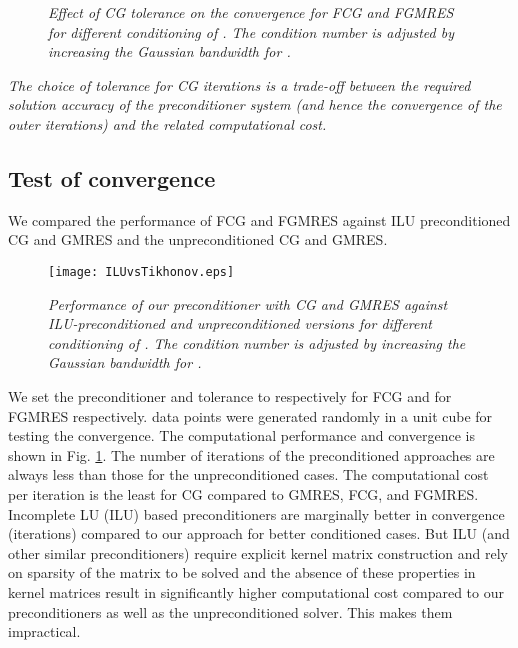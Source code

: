 \documentclass[10pt,journal,letterpaper,compsoc]{IEEEtran}
\begin{document}
\begin{figure}[p]
\centering
{}
\caption{\emph{Effect of CG tolerance  on the convergence for FCG and FGMRES for different conditioning of . The condition number is adjusted by increasing the Gaussian bandwidth  for .}}
\end{figure}

\emph{The choice of tolerance for CG iterations is a trade-off between the required solution accuracy of the   preconditioner system (and hence the convergence of the outer iterations) and the related computational cost. }

\subsection{Test of convergence\label{sec:TestOfConvergence}}
We compared the performance of FCG and FGMRES against ILU preconditioned CG and GMRES and the unpreconditioned CG and GMRES.

\begin{figure}[bth]
\centering
\texttt{[image: ILUvsTikhonov.eps]}
\caption{\emph{Performance of our preconditioner with CG and GMRES against ILU-preconditioned and unpreconditioned versions for different conditioning of . The condition number is adjusted by increasing the Gaussian bandwidth  for .\label{fig:fgmres}}}
\end{figure}

We set the preconditioner  and tolerance  to  respectively for FCG and  for FGMRES respectively.  data points were generated randomly in a unit cube for testing the convergence. The computational performance and convergence is shown in Fig. \ref{fig:fgmres}. The number of iterations of the preconditioned approaches are always less than those for the unpreconditioned cases. The computational cost per iteration is the least for CG compared to GMRES, FCG, and FGMRES. Incomplete LU (ILU) based preconditioners are marginally better in convergence (iterations) compared to our approach for better conditioned cases. But ILU (and other similar preconditioners) require explicit kernel matrix construction and rely on sparsity of the matrix to be solved and the absence of these properties in kernel matrices result in significantly higher computational cost compared to our preconditioners as well as the unpreconditioned solver. This makes them impractical.
\end{document}
